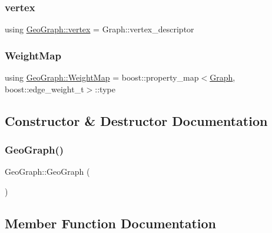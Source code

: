 \subsubsection{\texorpdfstring{vertex}{vertex}}
{\footnotesize\ttfamily using \mbox{\hyperlink{class_geo_graph_a24b9a457c1b212d947a891e3e12ea5d2}{Geo\+Graph\+::vertex}} =  Graph\+::vertex\+\_\+descriptor}

\mbox{\label{class_geo_graph_abc1f115f69f62ae60f5f0f71f7725a96}} 
\subsubsection{\texorpdfstring{WeightMap}{WeightMap}}
{\footnotesize\ttfamily using \mbox{\hyperlink{class_geo_graph_abc1f115f69f62ae60f5f0f71f7725a96}{Geo\+Graph\+::\+Weight\+Map}} =  boost\+::property\+\_\+map$<$\mbox{\hyperlink{class_geo_graph_a4f8c3bf1eb9f30bc227f300d7460debb}{Graph}}, boost\+::edge\+\_\+weight\+\_\+t$>$\+::type}



\subsection{Constructor \& Destructor Documentation}
\mbox{\label{class_geo_graph_a896afe4224d4b67108488b5416f3773c}} 
\subsubsection{\texorpdfstring{GeoGraph()}{GeoGraph()}}
{\footnotesize\ttfamily Geo\+Graph\+::\+Geo\+Graph (\begin{DoxyParamCaption}{ }\end{DoxyParamCaption})\hspace{0.3cm}{\ttfamily [default]}}



\subsection{Member Function Documentation}
\mbox{\label{class_geo_graph_a34e34580c4d4e29b1462aba375045628}} 
